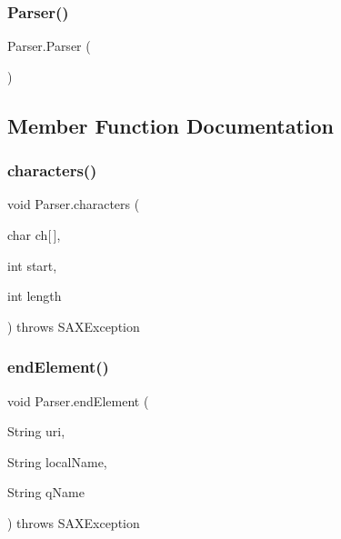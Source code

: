 \subsubsection{\texorpdfstring{Parser()}{Parser()}}
{\footnotesize\ttfamily Parser.\+Parser (\begin{DoxyParamCaption}{ }\end{DoxyParamCaption})}



\subsection{Member Function Documentation}
\hypertarget{class_parser_a47bcfb67533ee080c38771c5487edd90}{}\label{class_parser_a47bcfb67533ee080c38771c5487edd90} 
\subsubsection{\texorpdfstring{characters()}{characters()}}
{\footnotesize\ttfamily void Parser.\+characters (\begin{DoxyParamCaption}\item[{char}]{ch\mbox{[}$\,$\mbox{]},  }\item[{int}]{start,  }\item[{int}]{length }\end{DoxyParamCaption}) throws S\+A\+X\+Exception}

\hypertarget{class_parser_a6235e3c77c809f5012c95629345e0f2f}{}\label{class_parser_a6235e3c77c809f5012c95629345e0f2f} 
\subsubsection{\texorpdfstring{end\+Element()}{endElement()}}
{\footnotesize\ttfamily void Parser.\+end\+Element (\begin{DoxyParamCaption}\item[{String}]{uri,  }\item[{String}]{local\+Name,  }\item[{String}]{q\+Name }\end{DoxyParamCaption}) throws S\+A\+X\+Exception}

\hypertarget{class_parser_a6ca2235d63e8d6ce30a4a7c3e2deb523}{}\label{class_parser_a6ca2235d63e8d6ce30a4a7c3e2deb523} 
